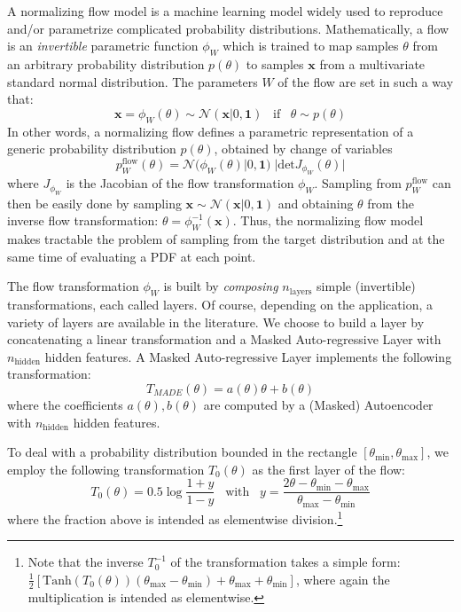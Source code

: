 \documentclass[twocolumn,showpacs,preprintnumbers,nofootinbib,prd,
superscriptaddress,10pt]{revtex4-2}
\begin{document}
A normalizing flow model \cite{norm_flow, nflows_paper, Kobyzev_2021, Papamakarios_thesis} is a machine learning model widely used to reproduce and/or parametrize complicated probability distributions.
Mathematically, a flow is an {\it invertible} parametric function $\phi_W$ which is trained to map samples $\theta$ from an arbitrary probability distribution $p(\theta)$ to samples $\mathbf{x}$ from a multivariate standard normal distribution.
The parameters $W$ of the flow are set in such a way that:
\begin{equation}
	\mathbf{x} = \phi_W(\theta) \sim \mathcal{N}(\mathbf{x}|0,\mathbf{1}) \;\;\; \text{if} \;\;\;  \theta \sim p(\theta)
\end{equation}
%
In other words, a normalizing flow defines a parametric representation of a generic probability distribution $p(\theta)$, obtained by change of variables
\begin{equation}\label{eq:p_flow}
	p^\text{flow}_W(\theta) = \mathcal{N}(\phi_W(\theta)|0,\mathbf{1}) \; |\text{det} J_{\phi_W}(\theta)|
\end{equation}
where $J_{\phi_W}$ is the Jacobian of the flow transformation $\phi_W$.
Sampling from $p^\text{flow}_W$ can then be easily done by sampling $\mathbf{x} \sim \mathcal{N}(\mathbf{x}|0,\mathbf{1})$ and obtaining $\theta$ from the inverse flow transformation: $\theta = \phi_W^{-1}(\mathbf{x})$.
Thus, the normalizing flow model makes tractable the problem of sampling from the target distribution and at the same time of evaluating a PDF at each point.


The flow transformation $\phi_W$ is built by {\it composing} $n_\text{layers}$ simple (invertible) transformations, each called layers. Of course, depending on the application, a variety of layers are available in the literature. We choose to build a layer by concatenating a linear transformation and a Masked Auto-regressive Layer \cite{MADE, MAF,MAF_bis} with $n_\text{hidden}$ hidden features.
A Masked Auto-regressive Layer implements the following transformation:
\begin{equation}
	T_{MADE}(\theta) = a(\theta)\theta+b(\theta)
\end{equation}
where the coefficients $a(\theta), b(\theta)$ are computed by a (Masked) Autoencoder with $n_\text{hidden}$ hidden features.

To deal with a probability distribution bounded in the rectangle $[\theta_\text{min}, \theta_\text{max}]$, we employ the following transformation $T_0(\theta)$ as the first layer of the flow:
\begin{equation}
	T_0(\theta) = 0.5 \log \frac{1 + y}{1 - y} \;\;\; \text{with} \;\;\; y = \frac{2\theta - \theta_\text{min} - \theta_\text{max}}{\theta_\text{max}- \theta_\text{min}}
\end{equation}
where the fraction above is intended as elementwise division.\footnote{
Note that the inverse $T_0^{-1}$ of the transformation takes a simple form: $\frac{1}{2} [\text{Tanh}(T_0(\theta))(\theta_\text{max} - \theta_\text{min})+\theta_\text{max}+ \theta_\text{min}]$, where again the multiplication is intended as elementwise.
}
\end{document}
